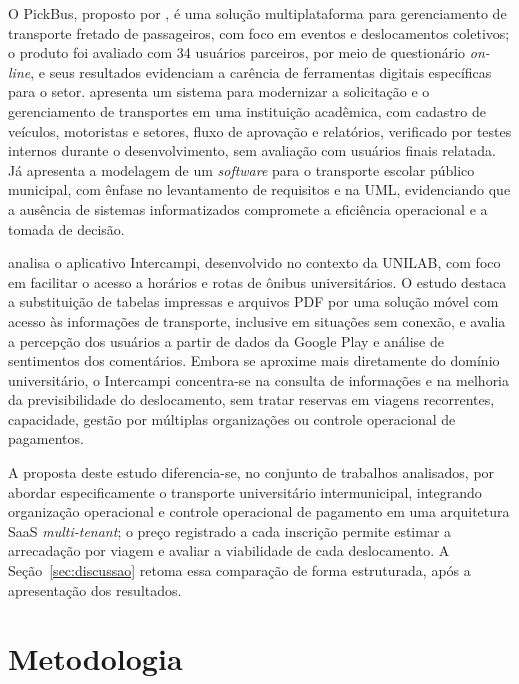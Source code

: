 \documentclass[a4paper,12pt]{article}
\begin{document}
O PickBus, proposto por , é uma solução multiplataforma para gerenciamento de transporte fretado de passageiros, com foco em eventos e deslocamentos coletivos; o produto foi avaliado com 34 usuários parceiros, por meio de questionário \textit{on-line}, e seus resultados evidenciam a carência de ferramentas digitais específicas para o setor.  apresenta um sistema para modernizar a solicitação e o gerenciamento de transportes em uma instituição acadêmica, com cadastro de veículos, motoristas e setores, fluxo de aprovação e relatórios, verificado por testes internos durante o desenvolvimento, sem avaliação com usuários finais relatada. Já  apresenta a modelagem de um \textit{software} para o transporte escolar público municipal, com ênfase no levantamento de requisitos e na UML, evidenciando que a ausência de sistemas informatizados compromete a eficiência operacional e a tomada de decisão.

 analisa o aplicativo Intercampi, desenvolvido no contexto da UNILAB, com foco em facilitar o acesso a horários e rotas de ônibus universitários. O estudo destaca a substituição de tabelas impressas e arquivos PDF por uma solução móvel com acesso às informações de transporte, inclusive em situações sem conexão, e avalia a percepção dos usuários a partir de dados da Google Play e análise de sentimentos dos comentários. Embora se aproxime mais diretamente do domínio universitário, o Intercampi concentra-se na consulta de informações e na melhoria da previsibilidade do deslocamento, sem tratar reservas em viagens recorrentes, capacidade, gestão por múltiplas organizações ou controle operacional de pagamentos.

A proposta deste estudo diferencia-se, no conjunto de trabalhos analisados, por abordar especificamente o transporte universitário intermunicipal, integrando organização operacional e controle operacional de pagamento em uma arquitetura SaaS \textit{multi-tenant}; o preço registrado a cada inscrição permite estimar a arrecadação por viagem e avaliar a viabilidade de cada deslocamento. A Seção~\ref{sec:discussao} retoma essa comparação de forma estruturada, após a apresentação dos resultados.

\section{Metodologia}
\label{sec:metodologia}
\end{document}

